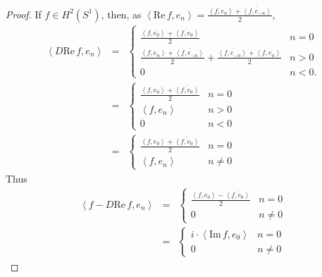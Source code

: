 \documentclass{article}
\newcommand{\inner}[2]{\left\langle #1, #2 \right\rangle}
\def\Re{\ensuremath{\mathrm{Re}}\,}
\def\Im{\ensuremath{\mathrm{Im}}\,}
\theoremstyle{definition}
\begin{document}
\begin{proof}
If $f \in H^2(S^1)$, then, as $\inner{\Re f}{e_n}=\frac{\inner{f}{e_n} +\overline{\inner{f}{e_{-n}}}}{2}$,
\begin{eqnarray*}
\inner{D\Re f}{e_n} & =&
\begin{cases}
\frac{ \inner{f}{e_0} +\overline{\inner{f}{e_0}}}{2}&n=0\\
\frac{\inner{f}{e_n} +\overline{\inner{f}{e_{-n}}}}{2}+\frac{\overline{\inner{f}{e_{-n}}} +\inner{f}{e_n}}{2}&n>0\\
0&n<0.
\end{cases}\\
&=&\begin{cases}
\frac{ \inner{f}{e_0} +\overline{\inner{f}{e_0}}}{2}&n=0\\
\inner{f}{e_n}&n>0\\
0&n<0
\end{cases}\\
&=&\begin{cases}
\frac{ \inner{f}{e_0} +\overline{\inner{f}{e_0}}}{2}&n=0\\
\inner{f}{e_n}&n \neq 0
\end{cases}
\end{eqnarray*}
Thus 
\begin{eqnarray*}
\inner{f-D\Re f}{e_n}&=&\begin{cases}
\frac{ \inner{f}{e_0} - \overline{\inner{f}{e_0}}}{2}&n=0\\
0&n \neq 0
\end{cases}\\
&=&\begin{cases}
i\cdot \inner{\Im f}{e_0}&n=0\\
0&n \neq 0
\end{cases}
\end{eqnarray*}
\end{proof}
\end{document}
